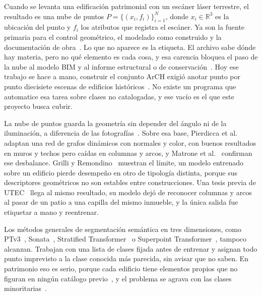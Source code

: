 
\renewcommand{\thetable}{\Alph{table}}

Cuando se levanta una edificación patrimonial con un escáner láser terrestre, el
resultado es una nube de puntos $P=\{(x_i,f_i)\}_{i=1}^{N}$, donde
$x_i\in\mathbb{R}^3$ es la ubicación del punto y $f_i$ los atributos que registra
el escáner. Ya son la fuente primaria para el control geométrico, el modelado
como construido y la documentación de obra~\cite{wang2019construction}. Lo que no
aparece es la etiqueta. El archivo sabe dónde hay materia, pero no qué elemento
es cada cosa, y esa carencia bloquea el paso de la nube al modelo BIM y al
informe estructural o de conservación~\cite{wang2019construction}. Hoy ese
trabajo se hace a mano, construir el conjunto ArCH exigió anotar punto por punto
diecisiete escenas de edificios históricos~\cite{matrone2020benchmark}. No existe
un programa que automatice esa tarea sobre clases no catalogadas, y ese vacío es
el que este proyecto busca cubrir.

La nube de puntos guarda la geometría sin depender del ángulo ni de la
iluminación, a diferencia de las fotografías~\cite{pierdicca2020dgcnn}. Sobre esa
base, Pierdicca et al.~\cite{pierdicca2020dgcnn} adaptan una red de grafos
dinámicos con normales y color, con buenos resultados en muros y techos pero
caídas en columnas y arcos, y Matrone et al.~\cite{matrone2020benchmark}
confirman ese desbalance. Grilli y Remondino~\cite{grilli2020generalisation}
muestran el límite, un modelo entrenado sobre un edificio pierde desempeño en
otro de tipología distinta, porque sus descriptores geométricos no son estables
entre construcciones. Una tesis previa de UTEC~\cite{tesisutec2024} llega al
mismo resultado, su modelo dejó de reconocer columnas y arcos al pasar de un
patio a una capilla del mismo inmueble, y la única salida fue etiquetar a mano y
reentrenar.

Los métodos generales de segmentación semántica en tres dimensiones, como
PTv3~\cite{wu2024ptv3}, Sonata~\cite{wu2025sonata}, Stratified
Transformer~\cite{lai2022stratified} o Superpoint
Transformer~\cite{robert2023spt}, tampoco alcanzan. Trabajan con una lista de
clases fijada antes de entrenar y asignan todo punto imprevisto a la clase
conocida más parecida, sin avisar que no saben. En patrimonio eso es serio,
porque cada edificio tiene elementos propios que no figuran en ningún catálogo
previo~\cite{grilli2020generalisation}, y el problema se agrava con las clases
minoritarias~\cite{su2025brdl}.

